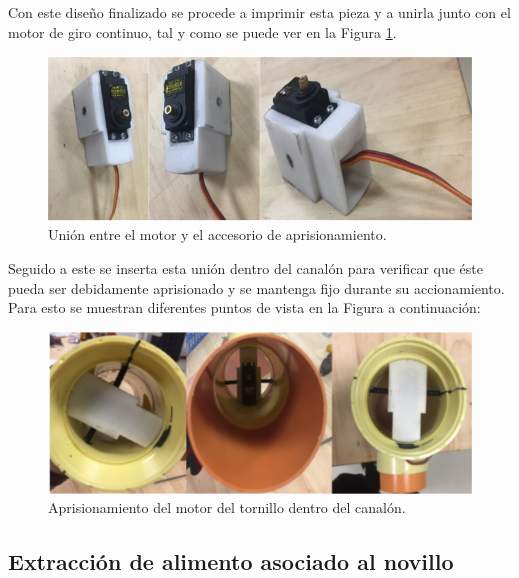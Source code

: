 Con este diseño finalizado se procede a imprimir esta pieza y a unirla junto con el motor de giro continuo, tal y como se puede ver en la Figura \ref{suspenejpng}.

\begin{figure}[H]
    \begin{center}
    	\includegraphics[scale=0.9]{img/suspenej2.png}
    \end{center}
    \caption{Unión entre el motor y el accesorio de aprisionamiento. \label{suspenejpng}}
\end{figure}

Seguido a este se inserta esta unión dentro del canalón para verificar que éste pueda ser debidamente aprisionado y se mantenga fijo durante su accionamiento. Para esto se muestran diferentes puntos de vista en la Figura a continuación:

\begin{figure}[H]
    \begin{center}
    	\includegraphics[scale=0.95]{img/prisionero2.png}
    \end{center}
    \caption{Aprisionamiento del motor del tornillo dentro del canalón. \label{prisioneropng}}
\end{figure}

\subsection{Extracción de alimento asociado al novillo}

